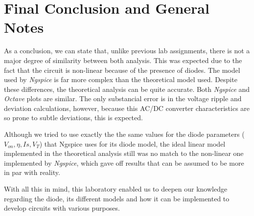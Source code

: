 \section{Final Conclusion and General Notes}
\label{sec:conclusion}

As a conclusion, we can state that, unlike previous lab assignments, there is not a major degree of similarity between both analysis. This was expected due to the fact that the circuit is non-linear because of the presence of diodes. The model used by \textit{Ngspice} is far more complex than the theoretical model used. Despite these differences, the theoretical analysis can be quite accurate. Both \textit{Ngspice} and \textit{Octave} plots are similar. The only substancial error is in the voltage ripple and deviation calculations, however, because this AC/DC converter characteristics are so prone to subtle deviations, this is expected. 

Although we tried to use exactly the the same values for the diode parameters ($V_{on}, \eta, Is, V_{T}$) that Ngspice uses for its diode model, the ideal linear model implemented in the theoretical analysis still was no match to the non-linear one implemented by \textit{Ngspice}, which gave off results that can be assumed to be more in par with reality.

With all this in mind, this laboratory enabled us to deepen our knowledge regarding the diode, its different models and how it can be implemented to develop circuits with various purposes.

